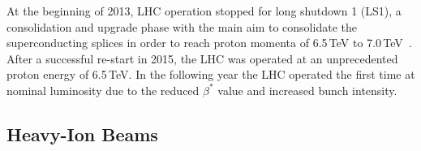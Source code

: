 At the beginning of 2013, LHC operation stopped for long shutdown 1 (LS1), a consolidation and upgrade phase with the main aim to consolidate the superconducting splices in order to reach proton momenta of 6.5\,TeV to 7.0\,TeV~\cite{IPAC13:MOZB202}.
After a successful re-start in 2015, the LHC was operated at an unprecedented proton energy of 6.5\,TeV. In the following year the LHC operated the first time at nominal luminosity due to the reduced $\beta^*$ value and increased bunch intensity.


\subsection{Heavy-Ion Beams}


